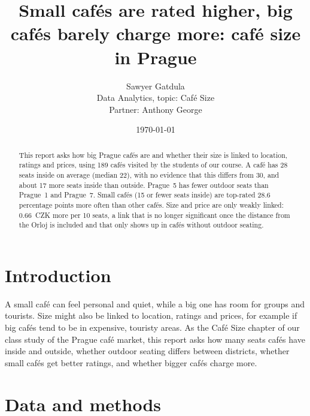 \documentclass[11pt,a4paper]{article}
\title{\textbf{Small caf\'es are rated higher, big caf\'es barely charge more: caf\'e size in Prague}}
\author{Sawyer Gatdula\\[0.3ex]\small Data Analytics, topic: Caf\'e Size\\[0.3ex]\small Partner: Anthony George}
\date{\today}
\begin{document}
\maketitle

\begin{abstract}
\noindent This report asks how big Prague caf\'es are and whether their size is linked to location, ratings and prices, using 189 caf\'es visited by the students of our course. A caf\'e has 28 seats inside on average (median 22), with no evidence that this differs from 30, and about 17 more seats inside than outside. Prague~5 has fewer outdoor seats than Prague~1 and Prague~7. Small caf\'es (15 or fewer seats inside) are top-rated 28.6 percentage points more often than other caf\'es. Size and price are only weakly linked: 0.66~CZK more per 10 seats, a link that is no longer significant once the distance from the Orloj is included and that only shows up in caf\'es without outdoor seating.
\end{abstract}

\FloatBarrier
\section{Introduction}
A small caf\'e can feel personal and quiet, while a big one has room for groups and tourists. Size might also be linked to location, ratings and prices, for example if big caf\'es tend to be in expensive, touristy areas. As the Caf\'e Size chapter of our class study of the Prague caf\'e market, this report asks how many seats caf\'es have inside and outside, whether outdoor seating differs between districts, whether small caf\'es get better ratings, and whether bigger caf\'es charge more.

\FloatBarrier
\section{Data and methods}

\FloatBarrier
\end{document}
